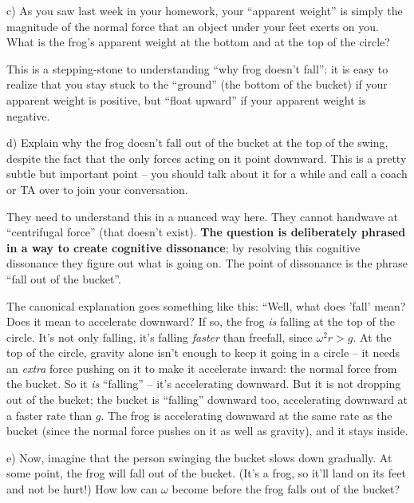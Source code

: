 \documentclass[12pt]{article}
\begin{document}
c) As you saw last week in your homework, your ``apparent weight'' is simply the magnitude of the normal force that an object under your feet exerts on you. What is the frog's apparent weight at the bottom and at the top of the circle?

{\color{Red} This is a stepping-stone to understanding ``why frog doesn't fall'': it is easy to realize that you stay stuck to the ``ground'' (the bottom of the bucket) if your apparent weight is positive, but ``float upward'' if your apparent weight is negative.}


\newpage
d) Explain why the frog doesn't fall out of the bucket at the top of the swing, despite the fact that the only forces acting on it point downward. This is a pretty subtle but important point -- you should talk about it for a while and call a coach or TA over to join your conversation.

{\color{Red} They need to understand this in a nuanced way here. They cannot handwave at ``centrifugal force'' (that doesn't exist). {\bf The question is deliberately phrased in a way to create cognitive dissonance}; by resolving this cognitive dissonance they figure out what is going on. The point of dissonance is the phrase ``fall out of the bucket''. 
	
	The canonical explanation goes something like this: ``Well, what does 'fall' mean? Does it mean to accelerate downward? If so, the frog {\it is} falling at the top of the circle. It's not only falling, it's falling {\it faster} than freefall, since $\omega^2 r > g$. At the top of the circle, gravity alone isn't enough to keep it going in a circle -- it needs an {\it extra} force pushing on it to make it accelerate inward: the normal force from the bucket. So it {\it is} ``falling'' -- it's accelerating downward. But it is not dropping out of the bucket; the bucket is ``falling'' downward too, accelerating downward at a faster rate than $g$. The frog is accelerating downward at the same rate as the bucket (since the normal force pushes on it as well as gravity), and it stays inside.
}



e) Now, imagine that the person swinging the bucket slows down gradually. At some point, the frog will fall out of the bucket. (It's a frog, so it'll land on its feet and not be hurt!) How low can $\omega$ become before the frog falls out of the bucket?
\end{document}
